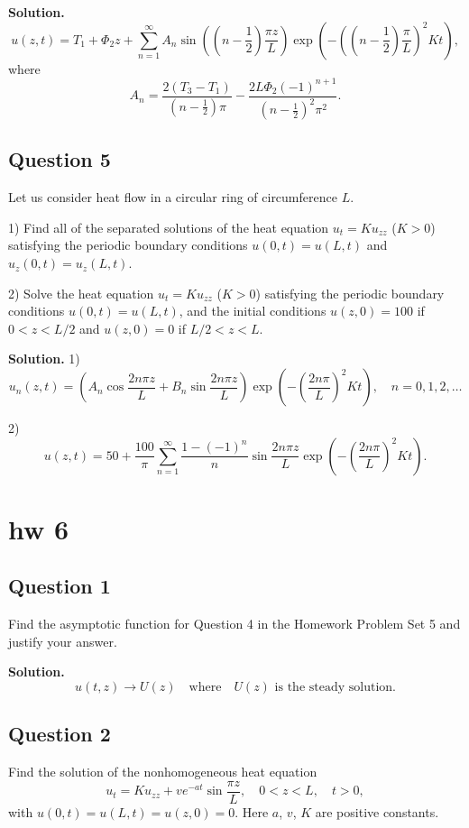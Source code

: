 \documentclass[lang=en,11pt]{template}
\begin{document}
\textbf{Solution.} 
\[
u(z,t) = T_1 + \Phi_2 z + \sum_{n=1}^{\infty} A_n \sin\left( \left( n - \frac{1}{2} \right) \frac{\pi z}{L} \right) \exp\left( -\left( \left( n - \frac{1}{2} \right) \frac{\pi}{L} \right)^2 K t \right),
\]
where
\[
A_n = \frac{2(T_3 - T_1)}{\left( n - \frac{1}{2} \right)\pi} - \frac{2L \Phi_2 (-1)^{n+1}}{\left( n - \frac{1}{2} \right)^2 \pi^2}.
\]

\section*{Question 5}
Let us consider heat flow in a circular ring of circumference $L$.

1) Find all of the separated solutions of the heat equation $u_t = K u_{zz}$ ($K > 0$) satisfying the periodic boundary conditions $u(0,t) = u(L,t)$ and $u_z(0,t) = u_z(L,t)$.

2) Solve the heat equation $u_t = K u_{zz}$ ($K > 0$) satisfying the periodic boundary conditions $u(0,t) = u(L,t)$, and the initial conditions $u(z,0) = 100$ if $0 < z < L/2$ and $u(z,0) = 0$ if $L/2 < z < L$.

\textbf{Solution.}
1) 
\[
u_n(z,t) = \left( A_n \cos \frac{2n\pi z}{L} + B_n \sin \frac{2n\pi z}{L} \right) \exp\left( -\left( \frac{2n\pi}{L} \right)^2 K t \right), \quad n = 0, 1, 2, \ldots
\]

2)
\[
u(z,t) = 50 + \frac{100}{\pi} \sum_{n=1}^{\infty} \frac{1 - (-1)^n}{n} \sin \frac{2n\pi z}{L} \exp\left( -\left( \frac{2n\pi}{L} \right)^2 K t \right).
\]







\chapter{hw 6}
\section*{Question 1}
Find the asymptotic function for Question 4 in the Homework Problem Set 5 and justify your answer.

\textbf{Solution.} 
\[
u(t, z) \to U(z) \quad \text{where} \quad U(z) \text{ is the steady solution.}
\]

\section*{Question 2}
Find the solution of the nonhomogeneous heat equation
\[
u_t = K u_{zz} + v e^{-at} \sin \frac{\pi z}{L}, \quad 0 < z < L, \quad t > 0,
\]
with $u(0,t) = u(L,t) = u(z,0) = 0$. Here $a$, $v$, $K$ are positive constants.
\end{document}
